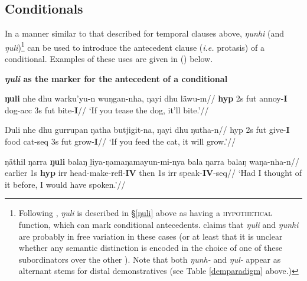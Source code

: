 \xe




\subsection{Conditionals}

In a manner similar to that described for temporal clauses above, \textit{ŋunhi} (and \textit{ŋuli})\footnote{Following \cite{Wilkinson1991}, \textit{ŋuli} is described in §\ref{ŋuli} above as having a \textsc{hypothetical} function, which can mark conditional antecedents. \citeauthor{Wilkinson1991} claims that \textit{ŋuli} and \textit{ŋunhi} are probably in free variation in these cases (or at least that it is unclear whether any semantic distinction is encoded in the choice of one of these subordinators over the other \citeyearpar[667]{Wilkinson1991}). Note that both \textit{ŋunh-} and \textit{ŋul-} appear as alternant stems for distal demonstratives (see Table \ref{demparadigm} above.)} can be used to introduce the antecedent clause (\textit{i.e.} protasis) of a conditional. Examples of these uses are given in (\nextx) below.


\pex\textbf{\textit{ŋuli} as the marker for the antecedent of a conditional}

\a
\begingl\gla \textbf{ŋuli} nhe dhu warku'yu-n wuŋgan-nha, ŋayi dhu läwu-m//
\glb \textbf{\gls{hyp}} 2s \gls{fut} annoy-\textbf{I} dog-\gls{acc} 3s \gls{fut} bite-\textbf{I}//
\glft`If you tease the dog, it'll bite.'//
\endgl


\a\begingl\gla Ŋuli nhe dhu gurrupan ŋatha butjigit-na, ŋayi dhu ŋutha-n//
\glb \gls{hyp} 2s \gls{fut} give-\textbf{I} food cat-\gls{seq} 3s \gls{fut} grow-\textbf{I}//
\glft`If you feed the cat, it will grow.'\trailingcitation[DG 20190405]//\endgl


\a
\begingl \gla ŋäthil ŋarra \textbf{ŋuli} balaŋ ḻiya-ŋamaŋamayun-mi-nya bala ŋarra balaŋ waŋa-nha-n//
\glb earlier 1s \textbf{\gls{hyp}} \gls{irr} head-make-\gls{refl}-\textbf{IV} then 1s \gls{irr} speak-\textbf{IV}-\gls{seq}//
\glft`Had I thought of it before, I would have spoken.'//
\endgl

